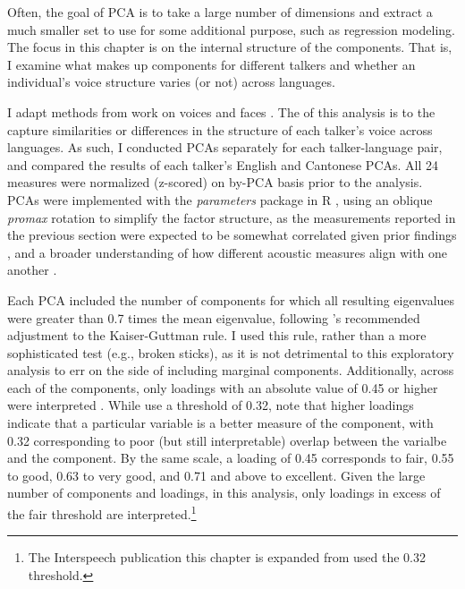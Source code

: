 Often, the goal of PCA is to take a large number of dimensions and extract a much smaller set to use for some additional purpose, such as regression modeling. The focus in this chapter is on the internal structure of the components. That is, I examine what makes up components for different talkers and whether an individual's voice structure varies (or not) across languages.  

I adapt methods from work on voices \citep{lee_2019_acoustic,lee_2020_language} and faces \citep{burton_2016_faces,turk_1991_eigenfaces}. The  of this analysis is to the capture similarities or differences in the structure of each talker's voice across languages. As such, I conducted PCAs separately for each talker-language pair, and compared the results of each talker's English and Cantonese PCAs. All 24 measures were normalized (z-scored) on by-PCA basis prior to the analysis. PCAs were implemented with the \textit{parameters} package \citep{makowski_2019_parameters} in R \citep{r_2021}, using an oblique \textit{promax} rotation to simplify the factor structure, as the measurements reported in the previous section were expected to be somewhat correlated given prior findings \citep{lee_2019_acoustic}, and a broader understanding of how different acoustic measures align with one another \citep{kreiman_2014_theory, kreiman_2021_validating}.

Each PCA included the number of components for which all resulting eigenvalues were greater than 0.7 times the mean eigenvalue, following \citeauthor{jolliffe_2002_pca}'s \citeyearpar{jolliffe_2002_pca} recommended adjustment to the Kaiser-Guttman rule. I used this rule, rather than a more sophisticated test (e.g., broken sticks), as it is not detrimental to this exploratory analysis to err on the side of including marginal components. Additionally, across each of the components, only loadings with an absolute value of 0.45 or higher were interpreted \citep{lee_2019_acoustic, tabachnick_2013_statistics}. While \citet{lee_2019_acoustic} use a threshold of 0.32, \citet{tabachnick_2013_statistics} note that higher loadings indicate that a particular variable is a better measure of the component, with 0.32 corresponding to poor (but still interpretable) overlap between the varialbe and the component. By the same scale, a loading of 0.45 corresponds to fair, 0.55 to good, 0.63 to very good, and 0.71 and above to excellent. Given the large number of components and loadings, in this analysis, only loadings in excess of the fair threshold are interpreted.\footnote{The Interspeech publication this chapter is expanded from used the 0.32 threshold.} 

